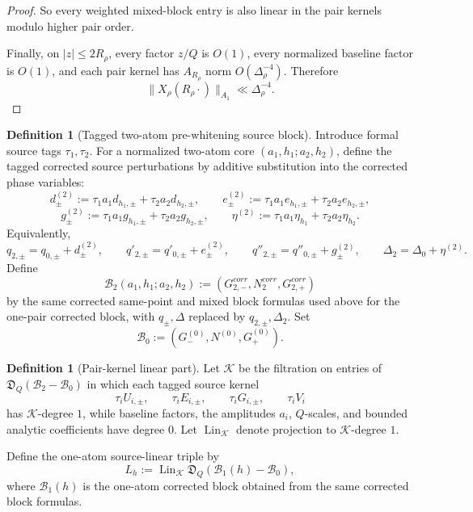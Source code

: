 \documentclass[11pt,a4paper]{amsart}
\def\corr{corr}%
\theoremstyle{plain}
\theoremstyle{definition}
\newtheorem{definition}[theorem]{Definition}
\newcommand{\corr}{\mathrm{corr}}
\begin{document}
\begin{proof}
So every weighted mixed-block entry is also linear in the pair kernels modulo
higher pair order.

Finally, on $|z|\le 2R_\rho$, every factor $z/Q$ is $O(1)$, every
normalized baseline factor is $O(1)$, and each pair kernel has $A_{R_\rho}$
norm $O(\Delta_\rho^{-4})$. Therefore
\[
\|X_\rho(R_\rho\cdot)\|_{A_1}\ll \Delta_\rho^{-4}.
\]
\end{proof}

\begin{definition}[Tagged two-atom pre-whitening source block]
\label{def:tagged-two-atom-prewhitening-source-block}
Introduce formal source tags \(\tau_1,\tau_2\).  For a normalized two-atom
core \((a_1,h_1;a_2,h_2)\), define the tagged corrected source perturbations by
additive substitution into the corrected phase variables:
\[
d_\pm^{(2)}:=\tau_1a_1d_{h_1,\pm}+\tau_2a_2d_{h_2,\pm},
\qquad
e_\pm^{(2)}:=\tau_1a_1e_{h_1,\pm}+\tau_2a_2e_{h_2,\pm},
\]
\[
g_\pm^{(2)}:=\tau_1a_1g_{h_1,\pm}+\tau_2a_2g_{h_2,\pm},
\qquad
\eta^{(2)}:=\tau_1a_1\eta_{h_1}+\tau_2a_2\eta_{h_2}.
\]
Equivalently,
\[
q_{2,\pm}=q_{0,\pm}+d_\pm^{(2)},\qquad
q'_{2,\pm}=q'_{0,\pm}+e_\pm^{(2)},\qquad
q''_{2,\pm}=q''_{0,\pm}+g_\pm^{(2)},\qquad
\Delta_2=\Delta_0+\eta^{(2)}.
\]
Define
\[
\mathcal B_2(a_1,h_1;a_2,h_2)
:=(G_{2,-}^{\corr},N_2^{\corr},G_{2,+}^{\corr})
\]
by the same corrected same-point and mixed block formulas used above for the
one-pair corrected block, with \(q_\pm,\Delta\) replaced by
\(q_{2,\pm},\Delta_2\).  Set
\[
\mathcal B_0:=(G_-^{(0)},N^{(0)},G_+^{(0)}).
\]
\end{definition}

\begin{definition}[Pair-kernel linear part]
\label{def:pair-kernel-linear-part}
Let \(\mathcal K\) be the filtration on entries of
\(\mathfrak D_Q(\mathcal B_2-\mathcal B_0)\) in which each tagged source kernel
\[
\tau_iU_{i,\pm},\qquad \tau_iE_{i,\pm},\qquad
\tau_iG_{i,\pm},\qquad \tau_iV_i
\]
has \(\mathcal K\)-degree \(1\), while baseline factors, the amplitudes \(a_i\),
\(Q\)-scales, and bounded analytic coefficients have degree \(0\).  Let
\(\operatorname{Lin}_{\mathcal K}\) denote projection to
\(\mathcal K\)-degree \(1\).

Define the one-atom source-linear triple by
\[
L_h:=\operatorname{Lin}_{\mathcal K}
\mathfrak D_Q(\mathcal B_1(h)-\mathcal B_0),
\]
where \(\mathcal B_1(h)\) is the one-atom corrected block obtained from the
same corrected block formulas.
\end{definition}
\end{document}
